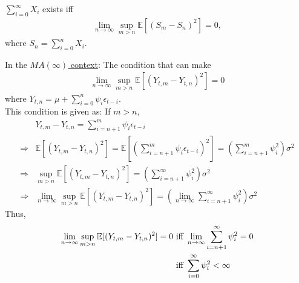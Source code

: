 \documentclass[11pt]{elegantbook}
\begin{document}
\begin{theorem}
    $\sum_{i=0}^\infty X_i$ exists iff
    \begin{equation}
        \begin{aligned}
            \lim_{n \rightarrow \infty}\sup_{m>n}\mathbb{E}[(S_m-S_n)^2]=0,
        \end{aligned}
        \nonumber
    \end{equation}
    where $S_n=\sum_{i=0}^n X_i$.
\end{theorem}
In the \underline{$MA(\infty)$ context}: The condition that can make
\begin{equation}
    \begin{aligned}
        \lim_{n \rightarrow \infty}\sup_{m>n}\mathbb{E}[(Y_{t,m}-Y_{t,n})^2]=0
    \end{aligned}
    \nonumber
\end{equation}
where $Y_{t,n}=\mu+\sum_{i=0}^n\psi_i\epsilon_{t-i}$.\\
This condition is given as: If $m>n$,
\begin{equation}
    \begin{aligned}
        &Y_{t,m}-Y_{t,n}=\sum_{i=n+1}^m\psi_i\epsilon_{t-i}\\
        \Rightarrow & \mathbb{E}[(Y_{t,m}-Y_{t,n})^2]=\mathbb{E}\left[\left(\sum_{i=n+1}^m\psi_i\epsilon_{t-i}\right)^2\right]=\left(\sum_{i=n+1}^m\psi_i^2\right)\sigma^2\\
        \Rightarrow & \sup_{m>n}\mathbb{E}[(Y_{t,m}-Y_{t,n})^2]=\left(\sum_{i=n+1}^\infty\psi_i^2\right)\sigma^2\\
        \Rightarrow & \lim_{n \rightarrow \infty}\sup_{m>n}\mathbb{E}[(Y_{t,m}-Y_{t,n})^2]=\left(\lim_{n \rightarrow \infty}\sum_{i=n+1}^\infty\psi_i^2\right)\sigma^2
    \end{aligned}
    \nonumber
\end{equation}
Thus,
\begin{equation}
    \begin{aligned}
        \lim_{n \rightarrow \infty}\sup_{m>n}\mathbb{E}[(Y_{t,m}-Y_{t,n})^2]=0 &\textnormal{ iff }\lim_{n \rightarrow \infty}\sum_{i=n+1}^\infty\psi_i^2=0\\
        &\textnormal{ iff }\sum_{i=0}^\infty\psi_i^2<\infty
    \end{aligned}
    \nonumber
\end{equation}
\end{document}
